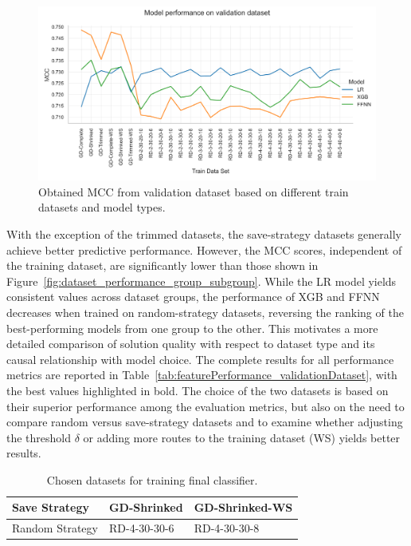 \begin{figure}[ht]
	\centering
	\includegraphics[width =\textwidth]{pictures/feature_filter/validation_line_plot.png}
	\caption{Obtained MCC from validation dataset based on different train datasets and model types.}
	\label{fig:validation_performance_line_plot}
\end{figure}

With the exception of the trimmed datasets, the save-strategy datasets generally achieve better predictive performance.
However, the MCC scores, independent of the training dataset, are significantly lower than those shown in
Figure~\ref{fig:dataset_performance_group_subgroup}. While the LR model yields consistent values across dataset groups,
the performance of XGB and FFNN decreases when trained on random-strategy datasets, reversing the ranking of the best-performing
models from one group to the other. This motivates a more detailed comparison of solution quality with respect to dataset type and
its causal relationship with model choice. The complete results for all performance metrics are reported in Table~\ref{tab:featurePerformance_validationDataset},
with the best values highlighted in bold. The choice of the two datasets is based on their superior performance among the evaluation metrics,
but also on the need to compare random versus save-strategy datasets and to examine whether adjusting the threshold $\delta$ or adding
more routes to the training dataset (WS) yields better results.

\begin{table}[ht]
	\centering
	\setlength{\tabcolsep}{0.75em}
	\def\arraystretch{1.5}
	\begin{tabular}{l|ll}
		Save Strategy   & GD-Shrinked  & GD-Shrinked-WS \\\hline
		Random Strategy & RD-4-30-30-6 & RD-4-30-30-8   \\
	\end{tabular}
	\caption{Chosen datasets for training final classifier.}
	\label{tab:chosen_datasets}
\end{table}

